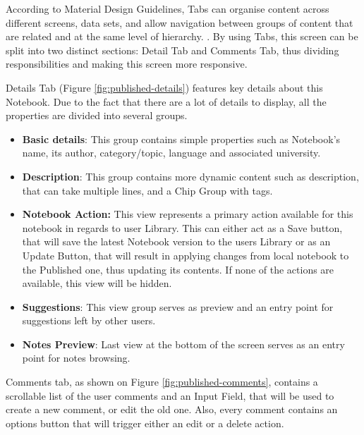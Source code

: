 \documentclass[thesis=B,english]{FITthesis}[2012/10/20]
\begin{document}
According to Material Design Guidelines, Tabs can organise content across different screens, data sets, and allow navigation between groups of content that are related and at the same level of hierarchy. \cite{material-tabs}. By using Tabs, this screen can be split into two distinct sections: Detail Tab and Comments Tab, thus dividing responsibilities and making this screen more responsive.
 

Details Tab (Figure \ref{fig:published-details}) features key details about this Notebook. Due to the fact that there are a lot of details to display, all the properties are  divided into several groups.

\begin{itemize}
	\item \textbf{Basic details}: This group contains simple properties such as Notebook's name, its author, category/topic, language and associated university.
	\item  \textbf{Description}: This group contains more dynamic content such as description, that can take multiple lines, and a Chip Group with tags.
	\item \textbf{Notebook Action:} This view represents a primary action available for this notebook in regards to user Library. This can either act as a Save button, that will save the latest Notebook version to the users Library or as an Update Button, that will result in applying changes from local notebook to the Published one, thus updating its contents. If none of the actions are available, this view will be hidden.
	 \item \textbf{Suggestions}: This view group serves as preview and an entry point for suggestions left by other users. 
	\item \textbf{Notes Preview}: Last view at the bottom of the screen serves as an entry point for notes browsing.
\end{itemize}
 
Comments tab, as shown on Figure \ref{fig:published-comments}, contains a scrollable list of the user comments and an Input Field, that will be used to create a new comment, or edit the old one. Also, every comment contains an options button that will trigger either an edit or a delete action.
\end{document}
